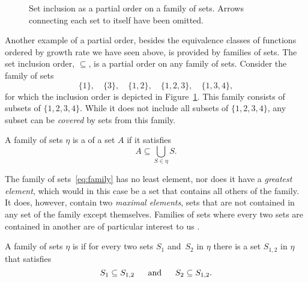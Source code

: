 \begin{figure}
  \centering
  \caption{
    Set inclusion as a partial order on a family of sets.
    Arrows connecting each set to itself have been omitted.
  }
  \label{fig:family}
\end{figure}
Another example of a partial order, besides the equivalence classes of functions ordered by growth rate we have seen above, is provided by families of sets.
The set inclusion order, $\subseteq$, is a partial order on any family of sets.
Consider the family of sets
\begin{equation}
\label{eq:family}
  \{1\},\quad\{3\},\quad\{1, 2\},\quad\{1, 2, 3\},\quad\{1, 3, 4\},
\end{equation}
for which the inclusion order is depicted in Figure~\ref{fig:family}.
This family consists of subsets of $\{1, 2, 3, 4\}$.
While it does not include all subsets of $\{1, 2, 3, 4\}$, any subset can be \emph{covered} by sets from this family.
\begin{definition}
  A family of sets $\eta$ is a  of a set $A$ if it satisfies
  \begin{equation*}
    A \subseteq \bigcup_{S \in \eta} S.
  \end{equation*}
\end{definition}

The family of sets~\eqref{eq:family} has no least element, nor does it have a \emph{greatest element}, which would in this case be a set that contains all others of the family.
It does, however, contain two \emph{maximal elements}\label{def:maximal}, sets that are not contained in any set of the family except themselves.
Families of sets where every two sets are contained in another are of particular interest to us \parencite[see also][]{abramsky1994domain,davey2002introduction}.
\begin{definition}
  A family of sets $\eta$ is  if for every two sets $S_1$ and~$S_2$ in $\eta$ there is a set $S_{1,2}$ in $\eta$ that satisfies
  \begin{equation*}
    S_1 \subseteq S_{1,2} \quad\;\text{ and }\;\quad S_2 \subseteq S_{1,2}.
  \end{equation*}
\end{definition}

